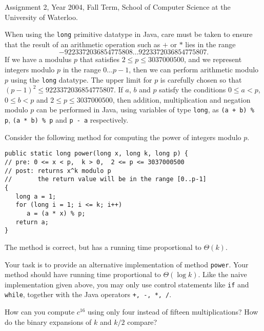 \begin{usage}
Assignment 2, Year 2004, Fall Term, School of Computer Science at the University of Waterloo.
\end{usage}

When using the {\tt long} primitive datatype in Java, care must be taken
to ensure that the result of an arithmetic operation such as $+$ or $\ast$
lies in the range 
$$-9223372036854775808\ldots 9223372036854775807.$$
If we have a modulus $p$
that satisfies $2\leq p \leq 3037000500$, and we represent integers modulo
$p$ in the range $0\ldots p-1$, then we can perform arithmetic modulo
$p$ using the {\tt long} datatype.  The upper limit for $p$ is carefully
chosen so that $(p-1)^2 \leq 9223372036854775807$.  If $a$, $b$
and $p$ satisfy the conditions $0 \leq a <
p$, $0 \leq b < p$ and $2 \leq p \leq 3037000500$, then
addition, multiplication and negation modulo $p$
can be performed in Java, using variables of type {\tt long},
as \verb[(a + b) % p[, \verb[(a * b) % p[ and \verb[p - a[ respectively.

\medskip  

Consider the following method for computing the power of integers
modulo $p$.
\begin{verbatim}
public static long power(long x, long k, long p) {
// pre: 0 <= x < p,  k > 0,  2 <= p <= 3037000500
// post: returns x^k modulo p
//       the return value will be in the range [0..p-1]
{
   long a = 1;
   for (long i = 1; i <= k; i++) 
      a = (a * x) % p;
   return a;
}
\end{verbatim}
The method is correct, but has a running time proportional to $\Theta(k)$.

\medskip

Your task is to provide an alternative implementation of method
{\tt power}.  Your method should have running time proportional to
$\Theta(\log k)$.
%
Like the naive implementation given above, you may only use control
statements like {\tt if} and {\tt while}, together with the Java
operators \verb[+, -, *, /[.


\begin{hint}
How can you compute $c^{16}$ using only four instead of fifteen
multiplications?  How do the binary expansions of $k$ and $k/2$ compare?
\end{hint}

